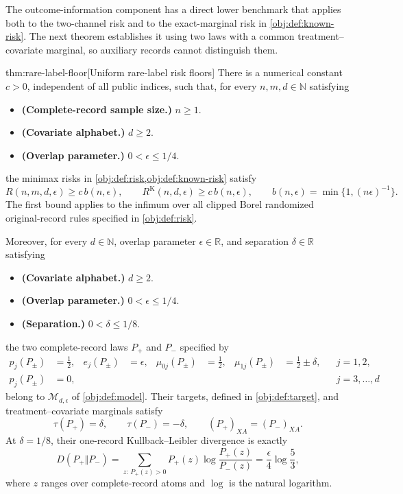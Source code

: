The outcome-information component has a direct lower benchmark that applies both to the two-channel risk and to the exact-marginal risk in \cref{obj:def:known-risk}. The next theorem establishes it using two laws with a common treatment--covariate marginal, so auxiliary records cannot distinguish them.

\begin{theoremv}{thm:rare-label-floor}[Uniform rare-label risk floors]
There is a numerical constant \(c>0\), independent of all public indices, such that, for every \(n,m,d\in\mathbb N\) satisfying
\begin{itemize}
\item \textbf{(Complete-record sample size.)} \(n\ge 1\).
\item \textbf{(Covariate alphabet.)} \(d\ge 2\).
\item \textbf{(Overlap parameter.)} \(0<\epsilon\le 1/4\).
\end{itemize}
the minimax risks in \cref{obj:def:risk,obj:def:known-risk} satisfy
\[
R(n,m,d,\epsilon)\ge c\,b(n,\epsilon),
\qquad
R^{\mathrm K}(n,d,\epsilon)\ge c\,b(n,\epsilon),
\qquad
b(n,\epsilon)=\min\{1,(n\epsilon)^{-1}\}.
\]
The first bound applies to the infimum over all clipped Borel randomized original-record rules specified in \cref{obj:def:risk}.

Moreover, for every \(d\in\mathbb N\), overlap parameter \(\epsilon\in\mathbb R\), and separation \(\delta\in\mathbb R\) satisfying
\begin{itemize}
\item \textbf{(Covariate alphabet.)} \(d\ge 2\).
\item \textbf{(Overlap parameter.)} \(0<\epsilon\le 1/4\).
\item \textbf{(Separation.)} \(0<\delta\le 1/8\).
\end{itemize}
the two complete-record laws \(P_+\) and \(P_-\) specified by
\[
\begin{aligned}
p_j(P_\pm)&=\frac12,
&
e_j(P_\pm)&=\epsilon,
&
\mu_{0j}(P_\pm)&=\frac12,
&
\mu_{1j}(P_\pm)&=\frac12\pm\delta,
&& j=1,2,\\
p_j(P_\pm)&=0,
&&&&&&&& j=3,\ldots,d
\end{aligned}
\]
belong to \(\mathcal M_{d,\epsilon}\) of \cref{obj:def:model}. Their targets, defined in \cref{obj:def:target}, and treatment–covariate marginals satisfy
\[
\tau(P_+)=\delta,
\qquad
\tau(P_-)=-\delta,
\qquad
(P_+)_{XA}=(P_-)_{XA}.
\]
At \(\delta=1/8\), their one-record Kullback--Leibler divergence is exactly
\[
D(P_+\Vert P_-)
=
\sum_{z:\,P_+(z)>0}
P_+(z)\log\frac{P_+(z)}{P_-(z)}
=
\frac{\epsilon}{4}\log\frac53,
\]
where \(z\) ranges over complete-record atoms and \(\log\) is the natural logarithm.
\end{theoremv}

